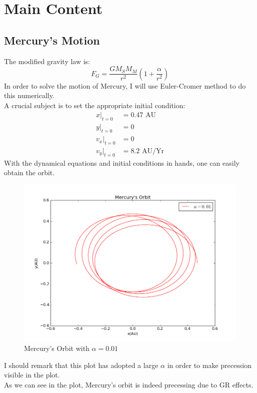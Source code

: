 \documentclass[10pt,a4paper]{article}
\begin{document}
    \section{Main Content}
    \subsection{Mercury's Motion}
    The modified gravity law is:
    \begin{equation}
    F_{G}=\frac{GM_SM_M}{r^2}(1+\frac{\alpha}{r^2})
    \end{equation}
    In order to solve the motion of Mercury, I will use Euler-Cromer method to do this numerically.\\
    A crucial subject is to set the appropriate initial condition:
    \begin{align}
    x|_{t=0}&=0.47\text{ AU}\\
    y|_{t=0}&=0\\
    v_x|_{t=0}&=0\\
    v_y|_{t=0}&=8.2\text{ AU/Yr}
    \end{align}
    With the dynamical equations and initial conditions in hands, one can easily obtain the orbit.\\
    \begin{figure}[htbp]
    	\centering
    	\includegraphics[width=5in]{Mercury_1.png}
    	\caption{Mercury's Orbit with $\alpha=0.01$}
    \end{figure}
    I should remark that this plot has adopted a large $\alpha$ in order to make precession visible in the plot.\\
    As we can see in the plot, Mercury's orbit is indeed precessing due to GR effects.\\
\end{document}
